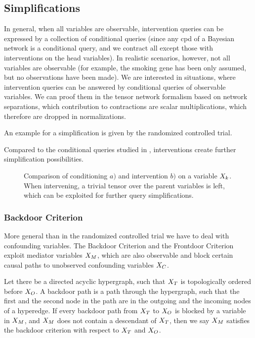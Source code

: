 \subsection{Simplifications}

In general, when all variables are observable, intervention queries can be expressed by a collection of conditional queries (since any cpd of a Bayesian network is a conditional query, and we contract all except those with interventions on the head variables).
In realistic scenarios, however, not all variables are observable (for example, the smoking gene has been only assumed, but no observations have been made).
We are interested in situations, where intervention queries can be answered by conditional queries of observable variables.
We can proof them in the tensor network formalism based on network separations, which contribution to contractions are scalar multiplications, which therefore are dropped in normalizations.

An example for a simplification is given by the randomized controlled trial.



Compared to the conditional queries studied in , interventions create further simplification possibilities.
\begin{figure}[t]
    
    \caption{Comparison of conditioning $a)$ and intervention $b)$ on a variable $X_{k}$.
    When intervening, a trivial tensor over the parent variables is left, which can be exploited for further query simplifications.}
\end{figure}

\subsubsection{Backdoor Criterion}

More general than in the randomized controlled trial we have to deal with confounding variables.
The Backdoor Criterion and the Frontdoor Criterion exploit mediator variables $X_{M}$, which are also observable and block certain causal paths to unobserved confounding variables $X_{C}$.

\begin{definition}\label{def:backdoorCriterion}
    Let there be a directed acyclic hypergraph, such that $X_{T}$ is topologically ordered before $X_{O}$.
    A backdoor path is a path through the hypergraph, such that the first and the second node in the path are in the outgoing and the incoming nodes of a hyperedge.
    If every backdoor path from $X_{T}$ to $X_{O}$ is blocked by a variable in $X_{M}$, and $X_{M}$ does not contain a descendant of $X_{T}$, then we say $X_{M}$ satisfies the backdoor criterion with respect to $X_{T}$ and $X_{O}$.
\end{definition}

